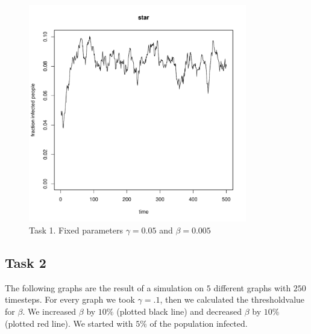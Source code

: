 \documentclass[paper=a4, fontsize=11pt]{scrartcl} %
\begin{document}
\begin{figure}[!h] %
   \centering
   \includegraphics[width=0.85\textwidth]{task1_star} 
\caption{Task 1. Fixed parameters $\gamma=0.05$ and $\beta=0.005$}
   \label{task1_star}
\end{figure}


\subsection{Task 2}
The following graphs are the result of a simulation on $5$ different graphs with $250$ timesteps. For every graph we took $\gamma=.1$, then we calculated the thresholdvalue for $\beta$. We increased $\beta$ by $10\%$ (plotted black line) and decreased $\beta$ by $10\%$ (plotted red line). We started with $5\%$ of the population infected.
\end{document}

